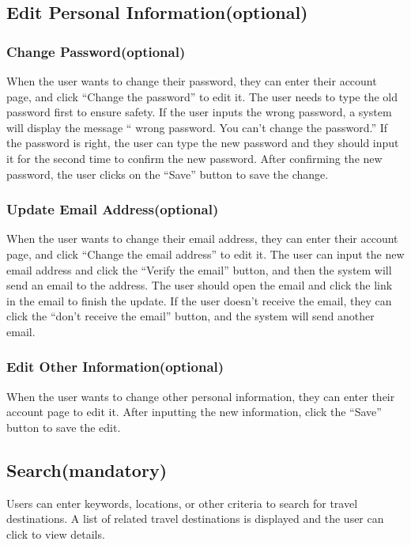 \documentclass[conference]{IEEEtran}
\begin{document}
\subsection{ Edit Personal Information(optional) }

\subsubsection{ Change Password(optional) }

When the user wants to change their password, they can enter their 
account page, and click “Change the password” to edit it. The user needs to 
type the old password first to ensure safety. If the user inputs the wrong 
password, a system will display the message “ wrong password. You can’t 
change the password.” If the password is right, the user can type the new 
password and they should input it for the second time to confirm the new
password. After confirming the new password, the user clicks on the “Save”
button to save the change.

\subsubsection{ Update Email Address(optional) }

When the user wants to change their email address, they can enter their 
account page, and click “Change the email address” to edit it. The user can 
input the new email address and click the “Verify the email” button, and then the 
system will send an email to the address. The user should open the email and 
click the link in the email to finish the update. If the user doesn't receive the 
email, they can click the “don’t receive the email” button, and the system will 
send another email.

\subsubsection{ Edit Other Information(optional) }

When the user wants to change other personal information, they can 
enter their account page to edit it. After inputting the new information, click 
the “Save” button to save the edit.

\subsection{ Search(mandatory) }

Users can enter keywords, locations, or other criteria to search for travel 
destinations.
A list of related travel destinations is displayed and the user can click to view 
details.
\end{document}
